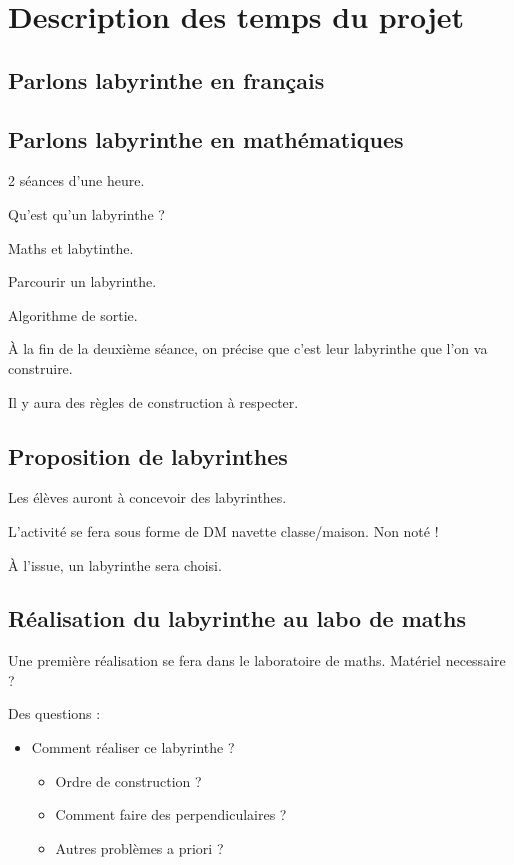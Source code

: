 
\section{Description des temps du projet}
\subsection{Parlons labyrinthe en français}


\subsection{Parlons labyrinthe en mathématiques}
2 séances d'une heure.

Qu'est qu'un labyrinthe ?

Maths et labytinthe.

Parcourir un labyrinthe.

Algorithme de sortie.

À la fin de la deuxième séance, on précise que c'est leur labyrinthe que l'on va construire.

Il y aura des règles de construction à respecter.

\subsection{Proposition de labyrinthes}
Les élèves auront à concevoir des labyrinthes.

L'activité se fera sous forme de DM navette classe/maison. Non noté !

À l'issue, un labyrinthe sera choisi.
\subsection{Réalisation du labyrinthe au labo de maths}
Une première réalisation se fera dans le laboratoire de maths.
Matériel necessaire ?

Des questions :
\begin{itemize}
    \item Comment réaliser ce labyrinthe ? 
    \begin{itemize}
        \item Ordre de construction ?
        \item Comment faire des perpendiculaires ?
        \item Autres problèmes a priori ?
    \end{itemize}
\end{itemize}

